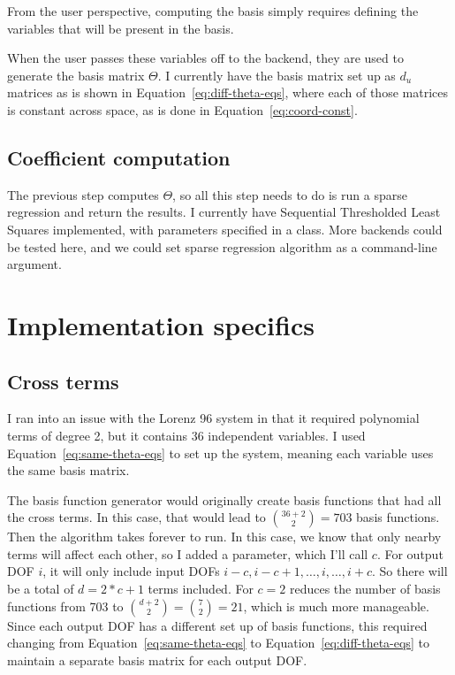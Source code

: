 \documentclass{article}
\def\lstinline#1{}%
\begin{document}
From the user perspective, computing the basis simply requires defining the variables
that will be present in the basis.

When the user passes these variables off to the backend, they are used to
generate the basis matrix $\Theta$.
I currently have the basis matrix set up as $d_u$ matrices as is shown in Equation~\ref{eq:diff-theta-eqs}, where
each of those matrices is constant across space, as is done in Equation~\ref{eq:coord-const}.


\subsection{Coefficient computation}

The previous step computes $\Theta$, so all this step needs to do is run a
sparse regression and return the results. I currently have Sequential
Thresholded Least Squares implemented, with parameters specified in a
\lstinline{SparseReg} class. More backends could be tested here, and we could
set sparse regression algorithm as a command-line argument.

\pagebreak
\section{Implementation specifics}

\subsection{Cross terms}
I ran into an issue with the Lorenz 96 system in that it required polynomial
terms of degree 2, but it contains 36 independent variables. I used
Equation~\ref{eq:same-theta-eqs} to set up the system, meaning each variable
uses the same basis matrix.

The basis function generator would originally create basis functions that had
all the cross terms. In this case, that would lead to $\binom{36 + 2}{2} = 703$
basis functions. Then the algorithm takes forever to run. In this case, we know
that only nearby terms will affect each other, so I added a
\lstinline{cross_term_range} parameter, which I'll call $c$. For output DOF $i$,
it will only include input DOFs $i-c,i-c+1,\hdots,i,\hdots,i+c$. So there will
be a total of $d = 2*c+1$ terms included. For $c=2$ reduces the number of basis
functions from 703 to $\binom{d+2}{2} = \binom{7}{2} = 21$, which is much more
manageable. Since each output DOF has a different set up of basis functions,
this required changing from Equation~\ref{eq:same-theta-eqs} to
Equation~\ref{eq:diff-theta-eqs} to maintain a separate basis matrix for each
output DOF.
\end{document}
